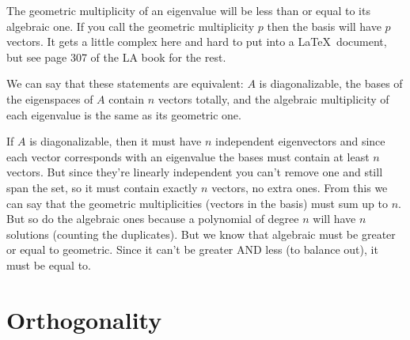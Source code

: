 \documentclass{article}
\begin{document}
The geometric multiplicity of an eigenvalue will be less than or equal to its algebraic one. If you call the geometric multiplicity $p$ then the basis will have $p$ vectors. It gets a little complex here and hard to put into a \LaTeX\, document, but see page 307 of the LA book for the rest.

We can say that these statements are equivalent: $A$ is diagonalizable, the bases of the eigenspaces of $A$ contain $n$ vectors totally, and the algebraic multiplicity of each eigenvalue is the same as its geometric one.

If $A$ is diagonalizable, then it must have $n$ independent eigenvectors and since each vector corresponds with an eigenvalue the bases must contain at least $n$ vectors. But since they're linearly independent you can't remove one and still span the set, so it must contain exactly $n$ vectors, no extra ones. From this we can say that the geometric multiplicities (vectors in the basis) must sum up to $n$. But so do the algebraic ones because a polynomial of degree $n$ will have $n$ solutions (counting the duplicates). But we know that algebraic must be greater or equal to geometric. Since it can't be greater AND less (to balance out), it must be equal to.

\section{Orthogonality}
\end{document}

